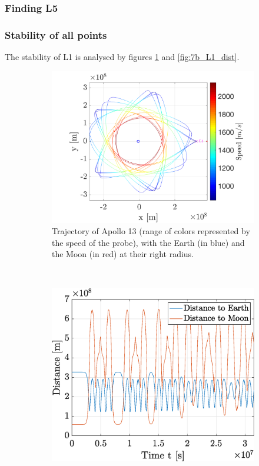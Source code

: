 \documentclass[a4paper,12pt,twoside]{article}
\begin{document}
\subsubsection{Finding L5}

\subsubsection{Stability of all points}
The stability of L1 is analysed by figures \ref{fig:7b_L1_traj} and \ref{fig:7b_L1_dist}.

\begin{figure}[h]
  \centering
  \begin{subfigure}[t]{0.55\textwidth}
    \includegraphics[width=\textwidth]{graphs/ex7b_L1_traj.png}
    \caption{Trajectory of Apollo 13 (range of colors represented by the speed of the probe), with the Earth (in blue) and the Moon (in red) at their right radius.}
    \label{fig:7b_L1_traj}
  \end{subfigure}
  ~
  \begin{subfigure}[t]{0.4\textwidth}
    \includegraphics[width=\textwidth]{graphs/ex7b_L1_dist.eps}

\end{subfigure}
\end{figure}
\end{document}
